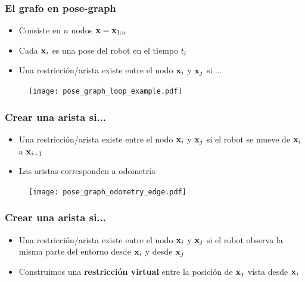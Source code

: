 \begin{frame}
    \frametitle{El grafo en pose-graph}
    
    \begin{itemize}
        \item Consiste en $n$ nodos $\boldsymbol{\mathbf{x}} = \boldsymbol{\mathbf{x}}_{1:n}$
        \item Cada $\boldsymbol{\mathbf{x}}_{i}$ es una pose del robot en el tiempo $t_{i}$
        \item Una restricción/arista existe entre el nodo $\boldsymbol{\mathbf{x}}_{i}$ y $\boldsymbol{\mathbf{x}}_{j}$ si ...
    \end{itemize}
    
     \begin{figure}[!h]
        \texttt{[image: pose\_graph\_loop\_example.pdf]}
    \end{figure}
    
\end{frame}

\begin{frame}
    \frametitle{Crear una arista si...}
    
    \begin{itemize}
        \item Una restricción/arista existe entre el nodo $\boldsymbol{\mathbf{x}}_{i}$ y $\boldsymbol{\mathbf{x}}_{j}$ si el robot se mueve de $\boldsymbol{\mathbf{x}}_{i}$ a $\boldsymbol{\mathbf{x}}_{i+1}$
        \item Las aristas corresponden a odometría
    \end{itemize}
    
    \begin{figure}[!h]
        \texttt{[image: pose\_graph\_odometry\_edge.pdf]}
    \end{figure}
    
\end{frame}


\begin{frame}
    \frametitle{Crear una arista si...}
    
    \begin{itemize}
        \item<1-> Una restricción/arista existe entre el nodo $\boldsymbol{\mathbf{x}}_{i}$ y $\boldsymbol{\mathbf{x}}_{j}$ si el robot observa la misma parte del entorno desde $\boldsymbol{\mathbf{x}}_{i}$ y desde $\boldsymbol{\mathbf{x}}_{j}$
        \item<2>  Construimos una {\bf restricción virtual} entre la posición de $\boldsymbol{\mathbf{x}}_{j}$ vista desde $\boldsymbol{\mathbf{x}}_{i}$
    \end{itemize}
    
\end{frame}

